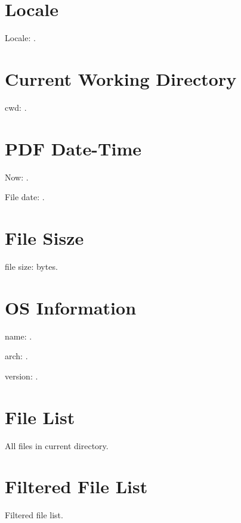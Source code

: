 \documentclass{article}
\begin{document}
\section{Locale}

\TeXOSQueryLocale{\result}
Locale: \texttt{\result}.

\section{Current Working Directory}

\TeXOSQueryCwd{\result}
cwd: \texttt{\result}.

\section{PDF Date-Time}
\TeXOSQueryNow{\result}
Now: \texttt{\result}.

File date: \texttt{\result}.

\section{File Sisze}

file size: \result bytes.

\section{OS Information}

\TeXOSQueryName{\result}
name: \result.

\TeXOSQueryArch{\result}
arch: \result.

\TeXOSQueryVersion{\result}
version: \result.

\section{File List}

All files in current directory.

\renewcommand{\do}[1]{\texttt{#1}.\par}

\expandafter\docsvlist\expandafter{\result}

\section{Filtered File List}

Filtered file list.

\expandafter\docsvlist\expandafter{\result}
\end{document}
